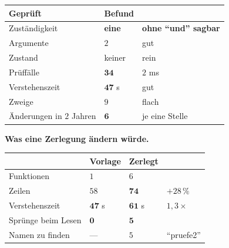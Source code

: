 \begin{merksatz}
\begin{center}
{\small
\renewcommand{\arraystretch}{1.45}
\begin{tabular}{@{}P{3.0cm}P{2.2cm}P{2.6cm}@{}}
\toprule
\textbf{Geprüft} & \textbf{Befund} & \\
\midrule
Zuständigkeit & \textcolor{gruen}{\textbf{eine}} & \textbf{ohne \enquote{und} sagbar}\\
Argumente & $2$ & \textcolor{gruen}{gut}\\
Zustand & \textcolor{gruen}{keiner} & \textcolor{gruen}{rein}\\
Prüffälle & $\mathbf{34}$ & \textcolor{gruen}{$2$ ms}\\
Verstehenszeit & $\mathbf{47}$ s & \textcolor{gruen}{gut}\\
Zweige & $9$ & \textcolor{gruen}{flach}\\
Änderungen in $2$ Jahren & $\mathbf{6}$ & \textcolor{gruen}{je eine Stelle}\\
\bottomrule
\end{tabular}}
\end{center}

\begin{center}
\begin{minipage}{0.88\textwidth}
\end{minipage}
\end{center}

\textbf{Was eine Zerlegung ändern würde.}

\begin{center}
\renewcommand{\arraystretch}{1.45}
\begin{tabular}{@{}P{2.8cm}P{2.0cm}P{2.2cm}P{2.0cm}@{}}
\toprule
& \textbf{Vorlage} & \textbf{Zerlegt} & \\
\midrule
Funktionen & $1$ & $6$ & \\
Zeilen & $58$ & $\mathbf{74}$ & $+28\,\%$\\
Verstehenszeit & $\mathbf{47}$ s & $\mathbf{61}$ s & \textcolor{akzent}{$1{,}3\times$}\\
Sprünge beim Lesen & $\mathbf{0}$ & $\mathbf{5}$ & \\
Namen zu finden & --- & \textcolor{akzent}{$5$} & \textcolor{akzent}{\enquote{pruefe2}}\\
\bottomrule
\end{tabular}
\end{center}

\begin{center}
\end{center}
\end{merksatz}


